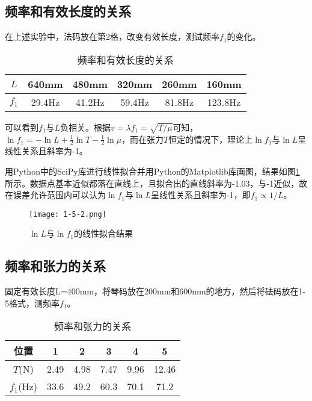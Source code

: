 \documentclass[12pt]{article}
\begin{document}
\subsection{频率和有效长度的关系}
在上述实验中，法码放在第2格，改变有效长度，测试频率$f_1$的变化。

\begin{table}[htbp]
    \centering
    \begin{tabular}{|c|c|c|c|c|c|}
        \hline
        $L$ & 640mm & 480mm & 320mm & 260mm & 160mm \\
        \hline
        $f_1$ & 29.4Hz & 41.2Hz & 59.4Hz & 81.8Hz & 123.8Hz \\
        \hline
    \end{tabular}
    \caption{频率和有效长度的关系}
\end{table}

可以看到$f_1$与$L$负相关。根据$v=\lambda f_1 = \sqrt{T/\mu}$可知，$\ln f_1 = -\ln L + \frac{1}{2} \ln T - \frac{1}{2} \ln \mu$，而在张力$T$恒定的情况下，理论上$\ln f_1$与$\ln L$呈线性关系且斜率为-1。

用Python中的SciPy库进行线性拟合并用Python的Matplotlib库画图，结果如图\ref{fig:3}所示。数据点基本近似都落在直线上，且拟合出的直线斜率为-1.03，与-1近似，故在误差允许范围内可以认为$\ln f_1$与$\ln L$呈线性关系且斜率为-1，即$f_1 \propto 1/L$。

\begin{figure}[htbp]
    \centering
    \texttt{[image: 1-5-2.png]}
    \caption{$\ln L$与$\ln f_1$的线性拟合结果}
    \label{fig:3}
\end{figure}

\subsection{频率和张力的关系}
固定有效长度L=400mm，将琴码放在200mm和600mm的地方，然后将砝码放在1-5格式，测频率$f_1$。

\begin{table}[h!]
    \centering
    \begin{tabular}{|c|c|c|c|c|c|}
        \hline
        位置   & 1    & 2    & 3    & 4    & 5 \\
        \hline
        $T$(N)    & 2.49  & 4.98  & 7.47  & 9.96  & 12.46  \\
        \hline
        $f_1$(Hz)   & 33.6 & 49.2 & 60.3 & 70.1 & 71.2 \\
        \hline
    \end{tabular}%
    \caption{频率和张力的关系}
\end{table}%
\end{document}
